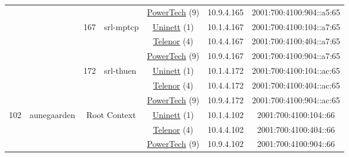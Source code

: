 \begin{small}
\begin{center}
\begin{longtable}{|c|c|c|c|c|c|c|c|}
  &  &  &  & \multicolumn{2}{|c|}{\tiny{\href{http://www.powertech.no}{PowerTech} (9)}} & \tiny{10.9.4.165} & \tiny{2001:700:4100:904::a5:65} \\* \cline{3-3}\cline{4-4}\cline{5-5}\cline{6-6}\cline{7-7}\cline{8-8}
  &  & \multirow{3}{*}{\tiny{167}} & \multicolumn{1}{|l|}{\multirow{3}{*}{\tiny{srl-mptcp}}} & \multicolumn{2}{|c|}{\tiny{\href{https://www.uninett.no}{Uninett} (1)}} & \tiny{10.1.4.167} & \tiny{2001:700:4100:104::a7:65} \\* \cline{5-5}\cline{6-6}\cline{7-7}\cline{8-8}
  &  &  &  & \multicolumn{2}{|c|}{\tiny{\href{https://www.telenor.no}{Telenor} (4)}} & \tiny{10.4.4.167} & \tiny{2001:700:4100:404::a7:65} \\* \cline{5-5}\cline{6-6}\cline{7-7}\cline{8-8}
  &  &  &  & \multicolumn{2}{|c|}{\tiny{\href{http://www.powertech.no}{PowerTech} (9)}} & \tiny{10.9.4.167} & \tiny{2001:700:4100:904::a7:65} \\* \cline{3-3}\cline{4-4}\cline{5-5}\cline{6-6}\cline{7-7}\cline{8-8}
  &  & \multirow{3}{*}{\tiny{172}} & \multicolumn{1}{|l|}{\multirow{3}{*}{\tiny{srl-thuen}}} & \multicolumn{2}{|c|}{\tiny{\href{https://www.uninett.no}{Uninett} (1)}} & \tiny{10.1.4.172} & \tiny{2001:700:4100:104::ac:65} \\* \cline{5-5}\cline{6-6}\cline{7-7}\cline{8-8}
  &  &  &  & \multicolumn{2}{|c|}{\tiny{\href{https://www.telenor.no}{Telenor} (4)}} & \tiny{10.4.4.172} & \tiny{2001:700:4100:404::ac:65} \\* \cline{5-5}\cline{6-6}\cline{7-7}\cline{8-8}
  &  &  &  & \multicolumn{2}{|c|}{\tiny{\href{http://www.powertech.no}{PowerTech} (9)}} & \tiny{10.9.4.172} & \tiny{2001:700:4100:904::ac:65} \\ \hline
 \multirow{45}{*}{\tiny{102}} & \multicolumn{1}{|l|}{\multirow{45}{*}{\tiny{aunegaarden}}} & \multicolumn{2}{|c|}{\multirow{3}{*}{\tiny{Root Context}}} & \multicolumn{2}{|c|}{\tiny{\href{https://www.uninett.no}{Uninett} (1)}} & \tiny{10.1.4.102} & \tiny{2001:700:4100:104::66} \\* \cline{5-5}\cline{6-6}\cline{7-7}\cline{8-8}
  &  & \multicolumn{2}{|c|}{} & \multicolumn{2}{|c|}{\tiny{\href{https://www.telenor.no}{Telenor} (4)}} & \tiny{10.4.4.102} & \tiny{2001:700:4100:404::66} \\* \cline{5-5}\cline{6-6}\cline{7-7}\cline{8-8}
  &  & \multicolumn{2}{|c|}{} & \multicolumn{2}{|c|}{\tiny{\href{http://www.powertech.no}{PowerTech} (9)}} & \tiny{10.9.4.102} & \tiny{2001:700:4100:904::66} \\* \cline{3-3}\cline{4-4}\cline{5-5}\cline{6-6}\cline{7-7}\cline{8-8}

\end{longtable}
\end{center}
\end{small}
